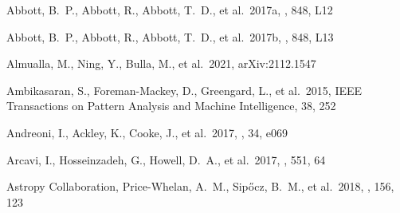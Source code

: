 \documentclass[twocolumn,twocolappendix]{aastex63}
\begin{document}
\clearpage




\begin{thebibliography}{}




 Abbott, B.~P., Abbott, R., Abbott, T.~D., et al.\ 2017a, \aj, 848, L12


 Abbott, B.~P., Abbott, R., Abbott, T.~D., et al.\ 2017b, \apjl, 848, L13









 Almualla, M., Ning, Y., Bulla, M., et al.\ 2021, arXiv:2112.1547



 Ambikasaran, S., Foreman-Mackey, D., Greengard, L., et al.\ 2015, IEEE Transactions on Pattern Analysis and Machine Intelligence, 38, 252




 Andreoni, I., Ackley, K., Cooke, J., et al.\ 2017, \pasa, 34, e069


 Arcavi, I., Hosseinzadeh, G., Howell, D.~A., et al.\ 2017, \nat, 551, 64




 Astropy Collaboration, Price-Whelan, A.~M., Sip{\H{o}}cz, B.~M., et al.\ 2018, \aj, 156, 123



\end{thebibliography}
\end{document}
